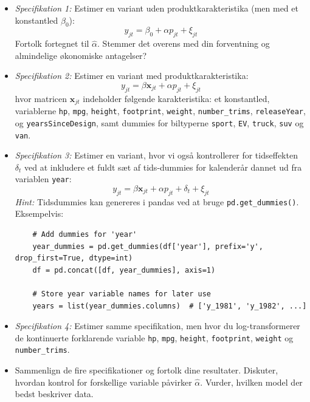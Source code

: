 \documentclass[a4paper,12pt]{article}
\begin{document}
\begin{itemize}
    \item \textit{Specifikation 1:} Estimer en variant uden produktkarakteristika (men med et konstantled $\beta_0$): 
$$y_{jt}= \beta_0 + \alpha p_{jt} + \xi_{jt}$$
Fortolk fortegnet til $\hat \alpha$. Stemmer det overens med din forventning og almindelige økonomiske antagelser?

\item \textit{Specifikation 2:} Estimer en variant med produktkarakteristika:
$$y_{jt}= \beta \mathbf{x}_{jt} + \alpha p_{jt} + \xi_{jt}$$
hvor matricen $\mathbf{x}_{jt}$ indeholder følgende karakteristika: et konstantled, variablerne  \texttt{hp}, \texttt{mpg}, \texttt{height}, \texttt{footprint}, \texttt{weight}, \texttt{number\_trims}, \texttt{releaseYear}, og \texttt{yearsSinceDesign}, samt dummies for biltyperne \texttt{sport}, \texttt{EV}, \texttt{truck}, \texttt{suv} og \texttt{van}. 

\item \textit{Specifikation 3:} Estimer en variant, hvor vi også kontrollerer for tidseffekten $\delta_t$ ved at inkludere et fuldt sæt af tids-dummies for kalenderår dannet ud fra variablen \texttt{year}:
$$
y_{jt}= \beta \mathbf{x}_{jt} + \alpha p_{jt} + \delta_t + \xi_{jt}
$$
\textit{Hint:} Tidsdummies kan genereres i pandas ved at bruge \texttt{pd.get\_dummies()}. Eksempelvis:


\begin{verbatim}
    # Add dummies for 'year'
    year_dummies = pd.get_dummies(df['year'], prefix='y', drop_first=True, dtype=int)
    df = pd.concat([df, year_dummies], axis=1)

    # Store year variable names for later use
    years = list(year_dummies.columns)  # ['y_1981', 'y_1982', ...] 
\end{verbatim}


\item \textit{Specifikation 4:} Estimer samme specifikation, men hvor du log-transformerer de kontinuerte forklarende variable
\texttt{hp}, \texttt{mpg}, \texttt{height}, \texttt{footprint}, \texttt{weight} og \texttt{number\_trims}.

\item Sammenlign de fire specifikationer og fortolk dine resultater. Diskuter, hvordan kontrol for forskellige variable påvirker $\hat \alpha$. Vurder, hvilken model der bedst beskriver data.
\end{itemize}
\hrulefill
\bigskip
\end{document}

